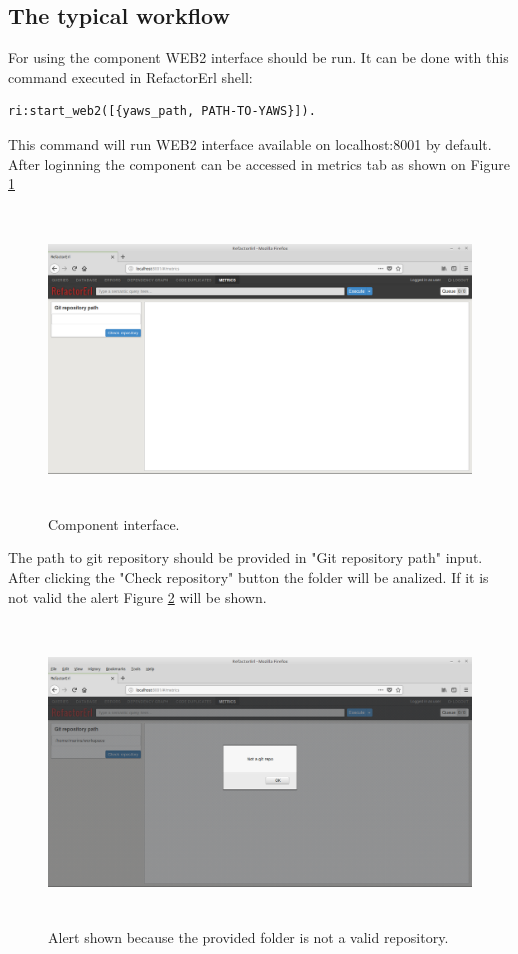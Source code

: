 \subsection{The typical workflow}

For using the component WEB2 interface should be run. It can be done with this command executed in RefactorErl shell:

\begin{lstlisting}[frame=none, numbers=none]
	ri:start_web2([{yaws_path, PATH-TO-YAWS}]).
\end{lstlisting}

This command will run WEB2 interface available on localhost:8001 by default. After loginning the component can be accessed in metrics tab as shown on Figure \ref{fig:metrics_interface}

\begin{figure}[h]
	\includegraphics[height=80mm]{figures/metrics.png}
	\caption{Component interface.}
	\label{fig:metrics_interface}
\end{figure}

The path to git repository should be provided in "Git repository path" input. After clicking the "Check repository" button the folder will be analized. If it is not valid the alert Figure \ref{fig:metrics_alert} will be shown.  

\begin{figure}[h]
	\includegraphics[height=80mm]{figures/alert.png}
	\caption{Alert shown because the provided folder is not a valid repository.}
	\label{fig:metrics_alert}
\end{figure}


